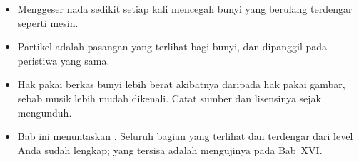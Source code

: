 \begin{rangkumanbox}
\begin{itemize}
        yang terlalu kuat daripada menaikkan yang terlalu pelan.
  \item Menggeser nada sedikit setiap kali mencegah bunyi yang berulang
        terdengar seperti mesin.
  \item Partikel adalah pasangan yang terlihat bagi bunyi, dan dipanggil pada
        peristiwa yang sama.
  \item Hak pakai berkas bunyi lebih berat akibatnya daripada hak pakai gambar,
        sebab musik lebih mudah dikenali. Catat sumber dan lisensinya sejak
        mengunduh.
  \item Bab ini menuntaskan . Seluruh bagian yang terlihat dan
        terdengar dari level Anda sudah lengkap; yang tersisa adalah mengujinya
        pada Bab~XVI.
\end{itemize}
\end{rangkumanbox}
